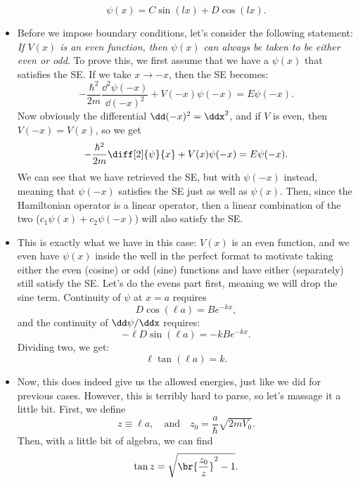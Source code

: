 \begin{itemize}
\begin{equation}
            \psi(x) = C\sin(lx) + D\cos(lx).
        \end{equation}
    \item Before we impose boundary conditions, let's consider the following statement: \textit{If $V(x)$ is an even function, then $\psi(x)$ can always be taken to be either even or odd}. To prove this, we first assume that we have a $\psi(x)$ that satisfies the SE. If we take $x \rightarrow -x$, then the SE becomes:
        \begin{equation*}
            -\frac{\hbar^2}{2m}\frac{\dd^2 \psi(-x)}{\dd (-x)^2} + V(-x)\psi(-x) = E\psi(-x).
        \end{equation*}
        Now obviously the differential $\dd (-x)^2 = \ddx^2$, and if $V$ is even, then $V(-x) = V(x)$, so we get
        \begin{equation*}
            -\frac{\hbar^2}{2m}\diff[2]{\psi}{x} + V(x)\psi(-x) = E\psi(-x).
        \end{equation*}
        We can see that we have retrieved the SE, but with $\psi(-x)$ instead, meaning that $\psi(-x)$ satisfies the SE just as well as $\psi(x)$. Then, since the Hamiltonian operator is a linear operator, then a linear combination of the two ($c_1\psi(x) + c_2\psi(-x)$) will also satisfy the SE.
    \item This is exactly what we have in this case: $V(x)$ is an even function, and we even have $\psi(x)$ inside the well in the perfect format to motivate taking either the even (cosine) or odd (sine) functions and have either (separately) still satisfy the SE. Let's do the evens part first, meaning we will drop the sine term. Continuity of $\psi$ at $x=a$ requires
        \begin{equation*}
            D\cos(\ell a) = Be^{-kx},
        \end{equation*}
        and the continuity of $\dd\psi/\ddx$ requires:
        \begin{equation*}
            -\ell D\sin(\ell a) = -kBe^{-kx}.
        \end{equation*}
        Dividing two, we get:
        \begin{equation}
            \ell\tan(\ell a) = k.
        \end{equation}
    \item Now, this does indeed give us the allowed energies, just like we did for previous cases. However, this is terribly hard to parse, so let's massage it a little bit. First, we define
        \begin{equation}
            z \equiv \ell a, \quad \mathrm{and} \quad z_0 = \frac{a}{\hbar}\sqrt{2mV_0}.
        \end{equation}
        Then, with a little bit of algebra, we can find
        \begin{equation}
            \tan z = \sqrt{\br{\frac{z_0}{z}}^2 - 1}.\label{eq:FiniteSquareWellEQ}
        \end{equation}
\end{itemize}


